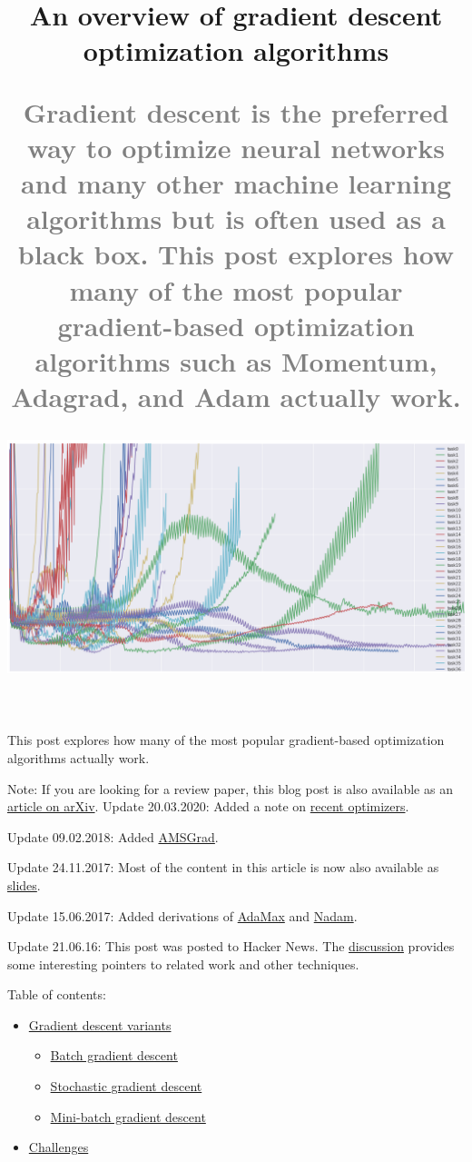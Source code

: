 \documentclass[4pt,journal,compsoc]{IEEEtran}
\title{
    \begin{flushleft}
        \textbf{\Huge An overview of gradient descent optimization algorithms} \newline
        
        \textbf{\textcolor{gray}{\large Gradient descent is the preferred way to optimize neural networks and many other machine learning algorithms but is often used as a black box. This post explores how many of the most popular gradient-based optimization algorithms such as Momentum, Adagrad, and Adam actually work.}}\newline
        
        \includegraphics[width = 18cm]{P001.PNG}
        
    \end{flushleft}
}
\begin{document}
    \maketitle

    \begin{flushleft}
    
    This post explores how many of the most popular gradient-based optimization algorithms actually work. \newline

    Note: If you are looking for a review paper, this blog post is also available as an \underline{article on arXiv}. \newline
    Update 20.03.2020: Added a note on \underline{recent optimizers}. \newline

    Update 09.02.2018: Added \underline{AMSGrad}. \newline

    Update 24.11.2017: Most of the content in this article is now also available as \underline{slides}. \newline

    Update 15.06.2017: Added derivations of \underline{AdaMax} and \underline{Nadam}. \newline

    Update 21.06.16: This post was posted to Hacker News. The \underline{discussion} provides some interesting pointers to related work and other techniques. \newline

    Table of contents: \newline
    
    \begin{itemize}
        \item \underline{Gradient descent variants}
        \begin{itemize}
            \item \underline{Batch gradient descent}
            \item \underline{Stochastic gradient descent}
            \item \underline{Mini-batch gradient descent}
        \end{itemize}
        
        \item \underline{Challenges}
        

\end{itemize}
\end{flushleft}
\end{document}
